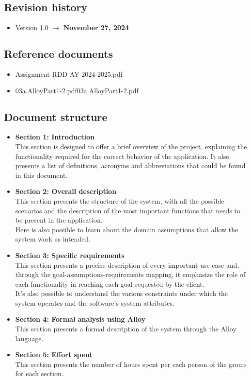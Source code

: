\documentclass[11pt,twoside]{article}
\begin{document}
	\subsection{Revision history}	
\begin{itemize}
\item Version 1.0 $\rightarrow$ \textbf{November 27, 2024}
\end{itemize}
	\subsection{Reference documents}
\begin{itemize}
\item Assignment RDD AY 2024-2025.pdf
\item 03a.AlloyPart1-2.pdf03a.AlloyPart1-2.pdf
\end{itemize}

	\subsection{Document structure}
\begin{itemize}
\item \textbf{Section 1: Introduction} \\
This section is designed to offer a brief overview of the project, explaining the functionality required for the correct behavior of the application. It also presents a list of definitions, acronyms and abbreviations that could be found in this document.
\item \textbf{Section 2: Overall description} \\
This section presents the structure of the system, with all the possible scenarios and the description of the most important functions that needs to be present in the application.\\
Here is also possible to learn about the domain assumptions that allow the system work as intended.
\item \textbf{Section 3: Specific requirements} \\
This section presents a precise description of every important use case and, through the goal-assumptions-requirements mapping, it emphasize the role of each functionality in reaching each goal requested by the client.\\
It's also possible to understand the various constraints under which the system operates and the software's system attributes.
\item \textbf{Section 4: Formal analysis using Alloy} \\
This section presents a formal description of the system through the Alloy language.
\item \textbf{Section 5: Effort spent} \\
This section presents the number of hours spent per each person of the group for each section.
\end{itemize}
\newpage
\end{document}
